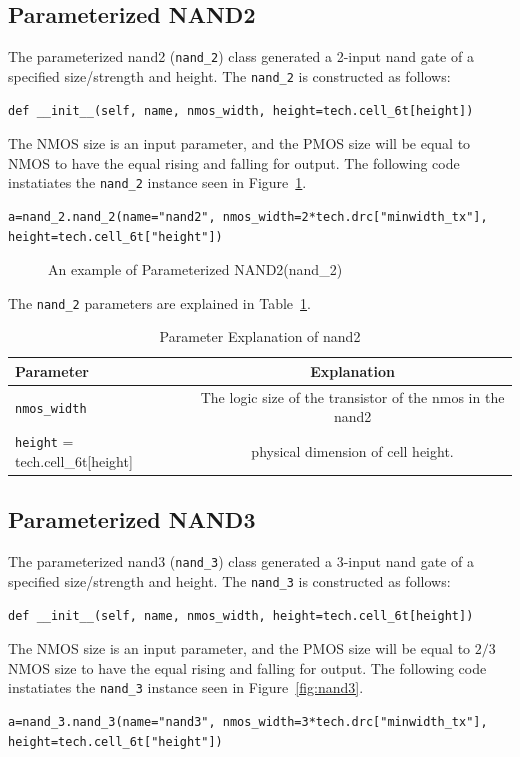 \subsection{Parameterized NAND2}
\label{sec:nand2}

The parameterized nand2 (\verb|nand_2|) class generated a 2-input nand gate
of a specified size/strength and height.  The \verb|nand_2| is
constructed as follows:
\begin{verbatim}
def __init__(self, name, nmos_width, height=tech.cell_6t[height])
\end{verbatim}

The NMOS size is an input parameter, and the PMOS size
will be equal to NMOS to have the equal rising and falling for output. 
The following code instatiates the \verb|nand_2| instance seen in Figure~\ref{fig:nand2}.
\begin{verbatim}
a=nand_2.nand_2(name="nand2", nmos_width=2*tech.drc["minwidth_tx"], 
height=tech.cell_6t["height"])
\end{verbatim}

\begin{figure}[h!]
\centering
\caption{An example of Parameterized NAND2(nand\_2)}
\label{fig:nand2}
\end{figure}


The \verb|nand_2| parameters are explained in Table~\ref{table:nand2_params}.
\begin{table}[h!] 
  \begin{center}
    \begin{tabular}{| l | c |}
    \hline
    Parameter & Explanation \\ \hline
    \verb|nmos_width| & The logic size of the transistor of the nmos in the nand2 \\ \hline
    \verb|height| = tech.cell\_6t[height] & physical dimension of cell height. \\ 
    \hline
    \end{tabular}
  \end{center}
  \caption{Parameter Explanation of nand2}
  \label{table:nand2_params}
\end{table}



\subsection{Parameterized NAND3}
\label{sec:nand3}

The parameterized nand3 (\verb|nand_3|) class generated a 3-input nand gate
of a specified size/strength and height.  The \verb|nand_3| is
constructed as follows:
\begin{verbatim}
def __init__(self, name, nmos_width, height=tech.cell_6t[height])
\end{verbatim}
The NMOS size is an input parameter, and the PMOS size
will be equal to $2/3$ NMOS size to have the equal rising and falling for output.
The following code instatiates the \verb|nand_3| instance seen in Figure~\ref{fig:nand3}.
\begin{verbatim}
a=nand_3.nand_3(name="nand3", nmos_width=3*tech.drc["minwidth_tx"], 
height=tech.cell_6t["height"])
\end{verbatim}


